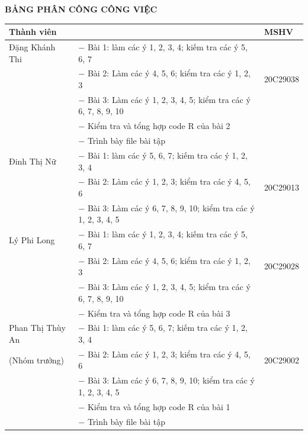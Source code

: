 \documentclass[a4paper]{article}
\theoremstyle{nonumberplain}
\begin{document}
\newpage
\thispagestyle{empty}
\begin{center}
\textbf{\large{BẢNG PHÂN CÔNG CÔNG VIỆC}\\}
\vspace{1cm}
\begin{tabular}{|m{3.7cm}||m{10cm}|m{1.8cm}|} 
\hline
\textbf{Thành viên} & \centering{\textbf{Công việc}} & \textbf{MSHV}\\
\hline
Đặng Khánh Thi & $-$ Bài 1: làm các ý 1, 2, 3, 4; kiếm tra các ý 5, 6, 7 & \\
& $-$ Bài 2: Làm các ý 4, 5, 6; kiểm tra các ý 1, 2, 3 & 20C29038 \\
& $-$ Bài 3: Làm các ý 1, 2, 3, 4, 5; kiểm tra các ý 6, 7, 8, 9, 10 & \\
& $-$ Kiểm tra và tổng hợp code R của bài 2 & \\
& $-$ Trình bày file bài tập & \\
\hline
Đinh Thị Nữ  & $-$ Bài 1: làm các ý  5, 6, 7; kiếm tra các ý 1, 2, 3, 4& \\
& $-$ Bài 2: Làm các ý 1, 2, 3; kiểm tra các ý 4, 5, 6 &  20C29013\\
& $-$ Bài 3: Làm các ý  6, 7, 8, 9, 10; kiểm tra các ý 1, 2, 3, 4, 5 & \\
\hline 
Lý Phi Long & $-$ Bài 1: làm các ý 1, 2, 3, 4; kiếm tra các ý 5, 6, 7 & \\
& $-$ Bài 2: Làm các ý 4, 5, 6; kiểm tra các ý 1, 2, 3 & 20C29028\\
& $-$ Bài 3: Làm các ý 1, 2, 3, 4, 5; kiểm tra các ý 6, 7, 8, 9, 10 & \\
& $-$ Kiểm tra và tổng hợp code R của bài 3 &\\
\hline
Phan Thị Thùy An & $-$ Bài 1: làm các ý  5, 6, 7; kiếm tra các ý 1, 2, 3, 4& \\
(Nhóm trưởng) & $-$ Bài 2: Làm các ý 1, 2, 3; kiểm tra các ý 4, 5, 6 & 20C29002 \\
& $-$ Bài 3: Làm các ý  6, 7, 8, 9, 10; kiểm tra các ý 1, 2, 3, 4, 5 & \\
& $-$ Kiểm tra và tổng hợp code R của bài 1 & \\
& $-$ Trình bày file bài tập & \\
\hline
\end{tabular}
\end{center}

\newpage
\end{document}
